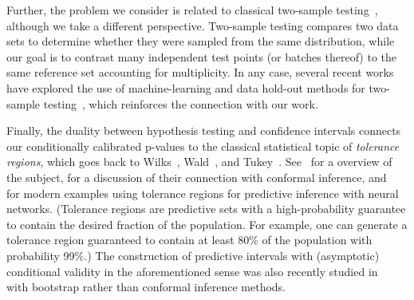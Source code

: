 \documentclass[11pt]{article}
\begin{document}
Further, the problem we consider is related to classical two-sample testing~\cite{wilcoxon1992individual}, although we take a different perspective. Two-sample testing {compares} two data sets to determine whether they were sampled from the same distribution, while our goal is to {contrast} many independent test points (or batches thereof) to the same reference set accounting for {multiplicity}. In any case, several recent works have explored the use of machine-learning and data hold-out methods for two-sample testing~{\cite{friedman2004multivariate,lopez2017revisiting,kuchibhotla2020exchangeability,hu2020distributionfree,kim2021classification}}, which reinforces the connection with our work.

Finally, the duality between hypothesis testing and confidence intervals connects our conditionally calibrated p-values to the classical statistical topic of \emph{tolerance regions}, which goes back to Wilks~\cite{wilks1941, wilks1942}, Wald~\cite{wald1943}, and Tukey~\cite{tukey1947}. {See~\cite{krishnamoorthy2009statistical} for a overview of the subject, \cite{vovk2012conditional} for a discussion of their connection with conformal inference, and~\cite{Park2020PAC,bates2021distributionfree} for modern examples using tolerance regions for predictive inference with neural networks.} (Tolerance regions are predictive sets with a high-probability guarantee to contain the desired fraction of the population. For example, one can generate a tolerance region guaranteed to contain at least 80\% of the population with probability 99\%.{)}
{The construction of predictive intervals with (asymptotic) conditional validity in the aforementioned sense was also recently studied in~\cite{zhang2020bootstrap} with bootstrap rather than conformal inference methods.}

\end{document}

